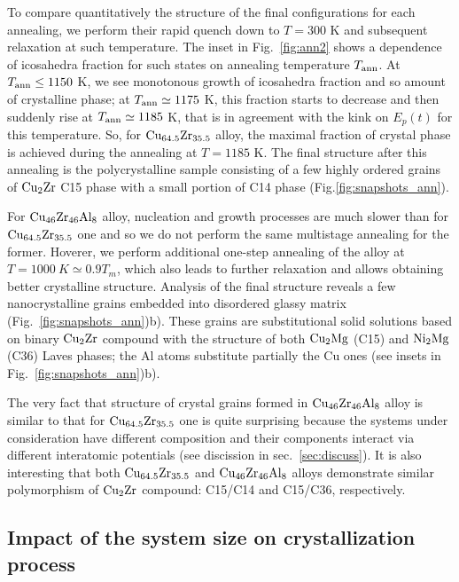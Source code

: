 \documentclass[jcp,twocolumn,superscriptaddress,floatfix,graphicx,showpacs]{revtex4-1}
\begin{document}
  To compare quantitatively the structure of the final configurations for each annealing, we perform their rapid quench down to $T=300$ K and subsequent relaxation at such temperature. The inset in  Fig.~\ref{fig:ann2} shows a dependence of icosahedra fraction for such states on annealing temperature $T_{\rm ann}$. At $T_{\rm ann}\leq 1150$ K, we see monotonous growth of icosahedra fraction and so amount of crystalline phase; at $T_{\rm ann} \simeq 1175$ K, this fraction starts to decrease and then suddenly rise at $T_{\rm ann} \simeq 1185$ K, that is in agreement with the kink on $E_p(t)$ for this temperature. So, for ${\rm Cu_{64.5}Zr_{35.5}}$ alloy, the maximal fraction of crystal phase is achieved during the annealing at $T=1185$ K.  The final structure after this annealing is the polycrystalline sample consisting of a few highly ordered grains of ${\rm Cu_2Zr}$ C15 phase with a small portion of C14 phase (Fig.\ref{fig:snapshots_ann}).

  For ${\rm Cu_{46}Zr_{46}Al_{8}}$ alloy, nucleation and growth processes are much slower than for ${\rm Cu_{64.5}Zr_{35.5}}$ one and so we do not perform the same multistage annealing for the former. Hoverer, we perform additional one-step annealing of the alloy at $T=1000~K\simeq 0.9T_m$, which also leads to further relaxation and allows obtaining better crystalline structure.  Analysis of the final structure reveals a few nanocrystalline grains embedded into disordered glassy matrix  (Fig.~\ref{fig:snapshots_ann})b). These grains are substitutional solid solutions based on binary ${\rm Cu_2Zr}$ compound with the structure of both ${\rm Cu_2Mg}$ (C15) and ${\rm Ni_2Mg}$ (C36)  Laves phases; the Al atoms substitute partially the Cu ones (see insets in Fig.~\ref{fig:snapshots_ann})b).

 The very fact that structure of crystal grains formed in ${\rm Cu_{46}Zr_{46}Al_{8}}$ alloy is similar to that for ${\rm Cu_{64.5}Zr_{35.5}}$ one is quite surprising because the systems under consideration have different composition and their components interact via different interatomic potentials (see discission in sec.~\ref{sec:discuss}). It is also interesting that both ${\rm Cu_{64.5}Zr_{35.5}}$ and ${\rm Cu_{46}Zr_{46}Al_{8}}$ alloys demonstrate similar polymorphism of ${\rm Cu_2Zr}$ compound: C15/C14 and C15/C36, respectively.

\subsection{Impact of the system size on crystallization process}
\end{document}
